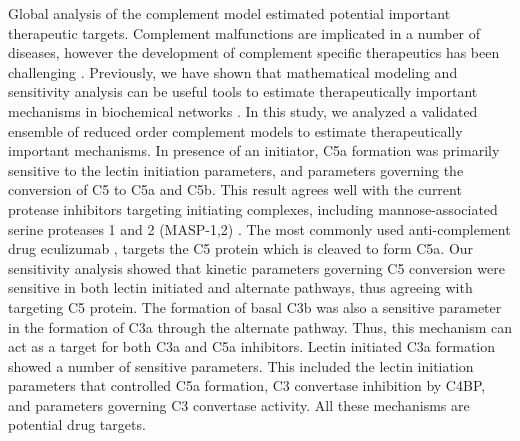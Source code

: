 \documentclass[12pt]{article}
\begin{document}
Global analysis of the complement model estimated potential important therapeutic targets.
Complement malfunctions are implicated in a number of diseases, however the
development of complement specific therapeutics has been challenging \cite{ricklin2007complement,morgan2015complement}.
Previously, we have shown that mathematical modeling and sensitivity analysis can be useful tools to estimate therapeutically important mechanisms in biochemical networks \cite{Luan:2007aa,Nayak:2008aa,Tasseff:2010aa,Rice:2016aa}.
In this study, we analyzed a validated ensemble of reduced order complement models to estimate therapeutically important mechanisms.
In presence of an initiator, C5a formation was primarily sensitive to the lectin initiation parameters,
and parameters governing the conversion of C5 to C5a and C5b.
This result agrees well with the current protease inhibitors targeting initiating complexes, including mannose-associated serine proteases 1 and  2 (MASP-1,2) \cite{heja2012monospecific}.
The most commonly used anti-complement drug eculizumab \cite{morgan2015complement}, targets the C5 protein which is cleaved to form C5a.
Our sensitivity analysis showed that kinetic parameters governing C5 conversion were sensitive in both lectin initiated and alternate pathways, thus agreeing with targeting C5 protein.
The formation of basal C3b was also a sensitive parameter in the formation of C3a through the alternate pathway.
Thus, this mechanism can act as a target for both C3a and C5a inhibitors.
Lectin initiated C3a formation showed a number of sensitive parameters.
This included the lectin initiation parameters that controlled C5a formation, C3 convertase inhibition by C4BP, and parameters governing C3 convertase activity.
All these mechanisms are potential drug targets.
\end{document}

